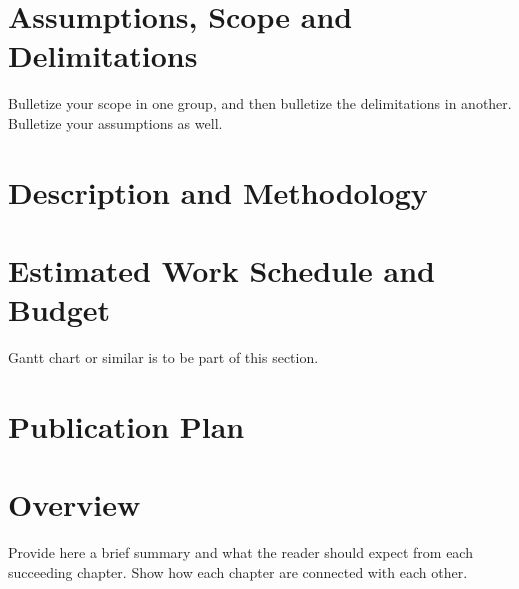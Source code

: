 \blindtext



\section{Assumptions, Scope and Delimitations}

Bulletize your scope in one group, and then bulletize the delimitations in another.  Bulletize your assumptions as well.


\section{Description and Methodology}

\blindtext


\ifFinished
\else

\section{Estimated Work Schedule and Budget}

Gantt chart or similar is to be part of this section.

\blindtext

\section{Publication Plan}
\blindtext

\fi


\section{Overview}

Provide here a brief summary and what the reader should expect from each succeeding chapter.  Show how each chapter are connected with each other.

